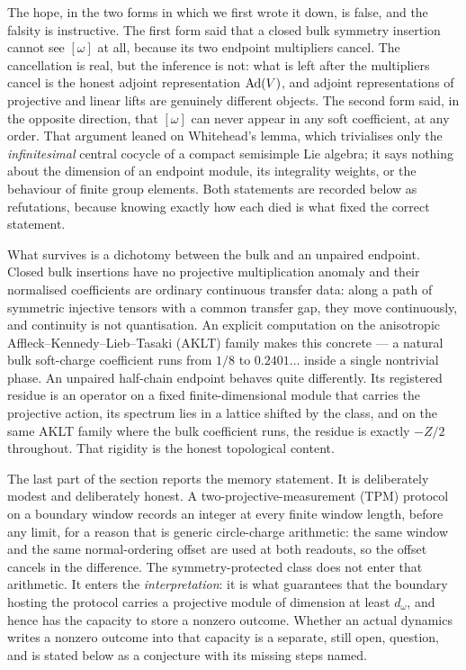 The hope, in the two forms in which we first wrote it down, is false, and the
falsity is instructive. The first form said that a closed bulk symmetry
insertion cannot see $[\omega]$ at all, because its two endpoint multipliers
cancel. The cancellation is real, but the inference is not: what is left after
the multipliers cancel is the honest adjoint representation $\operatorname{Ad}(V)$, and
adjoint representations of projective and linear lifts are genuinely
different objects. The second form said, in the opposite direction, that
$[\omega]$ can never appear in any soft coefficient, at any order. That
argument leaned on Whitehead's lemma, which trivialises only the
\emph{infinitesimal} central cocycle of a compact semisimple Lie algebra; it
says nothing about the dimension of an endpoint module, its integrality
weights, or the behaviour of finite group elements. Both statements are
recorded below as refutations, because knowing exactly how each died is what
fixed the correct statement.

What survives is a dichotomy between the bulk and an unpaired endpoint.
Closed bulk insertions have no projective multiplication anomaly and their
normalised coefficients are ordinary continuous transfer data: along a path of
symmetric injective tensors with a common transfer gap, they move
continuously, and continuity is not quantisation. An explicit computation on
the anisotropic Affleck--Kennedy--Lieb--Tasaki (AKLT) family makes this
concrete --- a natural bulk soft-charge coefficient runs from $1/8$ to
$0.2401\ldots$ inside a single nontrivial phase. An unpaired half-chain
endpoint behaves quite differently. Its registered residue is an operator on a
fixed finite-dimensional module that carries the projective action, its
spectrum lies in a lattice shifted by the class, and on the same AKLT family
where the bulk coefficient runs, the residue is exactly $-Z/2$ throughout.
That rigidity is the honest topological content.

The last part of the section reports the memory statement. It is deliberately
modest and deliberately honest. A two-projective-measurement (TPM) protocol on
a boundary window records an integer at every finite window length, before any
limit, for a reason that is generic circle-charge arithmetic: the same window
and the same normal-ordering offset are used at both readouts, so the offset
cancels in the difference. The symmetry-protected class does not enter that
arithmetic. It enters the \emph{interpretation}: it is what guarantees that
the boundary hosting the protocol carries a projective module of dimension at
least $d_\omega$, and hence has the capacity to store a nonzero outcome.
Whether an actual dynamics writes a nonzero outcome into that capacity is a
separate, still open, question, and is stated below as a conjecture with its
missing steps named.

